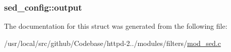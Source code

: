 \subsubsection[{\texorpdfstring{output}{output}}]{ sed\+\_\+config\+::output}\hypertarget{structsed__config_a44ea64e23d5cc2649d18f44ba92adaab}{}\label{structsed__config_a44ea64e23d5cc2649d18f44ba92adaab}


The documentation for this struct was generated from the following file\+:\begin{DoxyCompactItemize}
\item 
/usr/local/src/github/\+Codebase/httpd-\/2../modules/filters/\hyperlink{mod__sed_8c}{mod\+\_\+sed.\+c}\end{DoxyCompactItemize}
